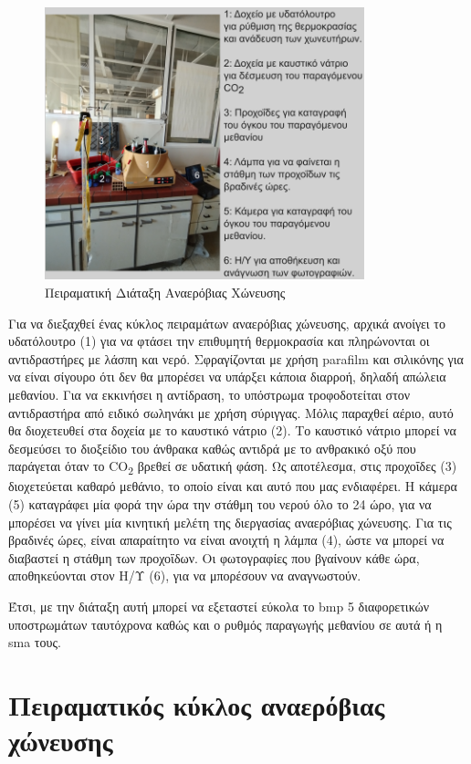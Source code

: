 \documentclass[11pt]{report}
\begin{document}
\begin{figure}[htbp]
\centering
\includegraphics[width=350px]{./anaerobic_digestion_captioned.png}
\caption{\label{fig:org05e8781}Πειραματική Διάταξη Αναερόβιας Χώνευσης}
\end{figure}

Για να διεξαχθεί ένας κύκλος πειραμάτων αναερόβιας χώνευσης, αρχικά ανοίγει το υδατόλουτρο (1) για να φτάσει την επιθυμητή θερμοκρασία και πληρώνονται οι αντιδραστήρες με λάσπη και νερό. Σφραγίζονται με χρήση parafilm και σιλικόνης για να είναι σίγουρο ότι δεν θα μπορέσει να υπάρξει κάποια διαρροή, δηλαδή απώλεια μεθανίου. Για να εκκινήσει η αντίδραση, το υπόστρωμα τροφοδοτείται στον αντιδραστήρα από ειδικό σωληνάκι με χρήση σύριγγας. Μόλις παραχθεί αέριο, αυτό θα διοχετευθεί στα δοχεία με το καυστικό νάτριο (2). Το καυστικό νάτριο μπορεί να δεσμεύσει το διοξείδιο του άνθρακα καθώς αντιδρά με το ανθρακικό οξύ που παράγεται όταν το CO\textsubscript{2} βρεθεί σε υδατική φάση. Ως αποτέλεσμα, στις προχοΐδες (3) διοχετεύεται καθαρό μεθάνιο, το οποίο είναι και αυτό που μας ενδιαφέρει. Η κάμερα (5) καταγράφει μία φορά την ώρα την στάθμη του νερού όλο το 24 ώρο, για να μπορέσει να γίνει μία κινητική μελέτη της διεργασίας αναερόβιας χώνευσης. Για τις βραδινές ώρες, είναι απαραίτητο να είναι ανοιχτή η λάμπα (4), ώστε να μπορεί να διαβαστεί η στάθμη των προχοΐδων. Οι φωτογραφίες που βγαίνουν κάθε ώρα, αποθηκεύονται στον Η/Υ (6), για να μπορέσουν να αναγνωστούν.

Έτσι, με την διάταξη αυτή μπορεί να εξεταστεί εύκολα το \acrfull{bmp} 5 διαφορετικών υποστρωμάτων ταυτόχρονα καθώς και ο ρυθμός παραγωγής μεθανίου σε αυτά ή η \acrfull{sma} τους. 

\section{Πειραματικός κύκλος αναερόβιας χώνευσης}
\label{sec:org857be16}
\label{sec:exp-ad}
\end{document}
